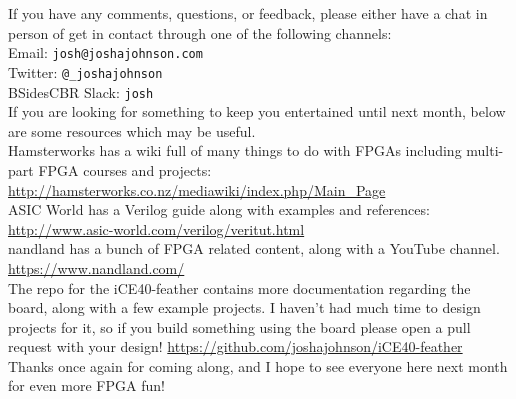 \documentclass[12pt,a4paper]{article}
\begin{document}
\noindent
If you have any comments, questions, or feedback, please either have a chat in person of get in contact through one of the following channels:\\
\noindent
Email: \texttt{josh@joshajohnson.com}\\
Twitter: \texttt{@\_joshajohnson}\\
BSidesCBR Slack: \texttt{josh}\\ 

\noindent
If you are looking for something to keep you entertained until next month, below are some resources which may be useful. \\

\noindent
Hamsterworks has a wiki full of many things to do with FPGAs including multi-part FPGA courses and projects: \url{http://hamsterworks.co.nz/mediawiki/index.php/Main_Page}\\

\noindent
ASIC World has a Verilog guide along with examples and references: \url{http://www.asic-world.com/verilog/veritut.html}\\

\noindent
nandland has a bunch of FPGA related content, along with a YouTube channel. \url{https://www.nandland.com/}\\

\noindent
The repo for the iCE40-feather contains more documentation regarding the board, along with a few example projects. I haven't had much time to design projects for it, so if you build something using the board please open a pull request with your design! \url{https://github.com/joshajohnson/iCE40-feather} \\

\noindent
Thanks once again for coming along, and I hope to see everyone here next month for even more FPGA fun!
\end{document}
